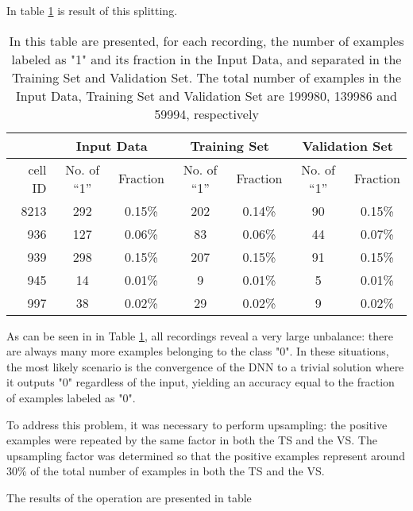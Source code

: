\documentclass{article}
\begin{document}
In table \ref{table:summary-beforeUS} is result of this splitting.
\begin{table}[htbp]
\begin{center}
\begin{tabular}{r|cc|cc|cc}
\multicolumn{1}{l|}{} & \multicolumn{ 2}{c|}{Input Data} & \multicolumn{ 2}{c|}{Training Set} & \multicolumn{ 2}{c}{Validation Set} \\ \hline
cell ID & No. of “1”  & Fraction & No. of “1”  & Fraction & No. of “1” & Fraction \\ \hline
8213 & 292 & 0.15\% & 202 & 0.14\% & 90 & 0.15\% \\ 
936 & 127 & 0.06\% & 83 & 0.06\% & 44 & 0.07\% \\ 
939 & 298 & 0.15\% & 207 & 0.15\% & 91 & 0.15\% \\ 
945 & 14 & 0.01\% & 9 & 0.01\% & 5 & 0.01\% \\ 
997 & 38 & 0.02\% & 29 & 0.02\% & 9 & 0.02\% \\ 
\end{tabular}
\end{center}
\caption{In this table are presented, for each recording, the number of examples labeled as "1" and its fraction in the Input Data, and separated in the Training Set and Validation Set. The total number of examples in the Input Data, Training Set and Validation Set are 199980, 139986 and 59994, respectively}
\label{table:summary-beforeUS}
\end{table}

As can be seen in in Table \ref{table:summary-beforeUS}, all recordings reveal a very large unbalance: there are always many more examples belonging to the class "0". In these situations, the most likely scenario is the convergence of the DNN to a trivial solution where it outputs "0" regardless of the input, yielding an accuracy equal to the fraction of examples labeled as "0".

To address this problem, it was necessary to perform upsampling: the positive examples were repeated by the same factor in both the TS and the VS. The upsampling factor was determined so that the positive examples represent around 30\% of the total number of examples in both the TS and the VS.

The results of the operation are presented in table 
\end{document}
